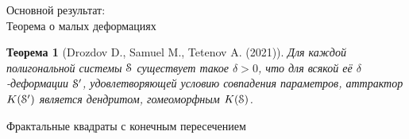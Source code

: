 \documentclass[aspectratio=1610, 10pt, notheorems]{beamer}
\newtheorem{theorem}     {Теорема}
\newtheorem{definition}  {Определение}
\begin{document}





\begin{frame}{Основной результат:\\Теорема о малых деформациях}
\begin{theorem}[Drozdov D., Samuel M., Tetenov A. (2021)]
Для каждой полигональной системы ${\EuScript S}$ существует такое $\delta > 0$, что для всякой её $\delta$-деформации ${\EuScript S}'$, удовлетворяющей условию совпадения параметров, аттрактор $K({\EuScript S}')$ является дендритом, гомеоморфным $K({\EuScript S})$.
\end{theorem}
\end{frame}


\begin{frame}{}
\Huge{Фрактальные квадраты с конечным пересечением}
\end{frame}
\end{document}
